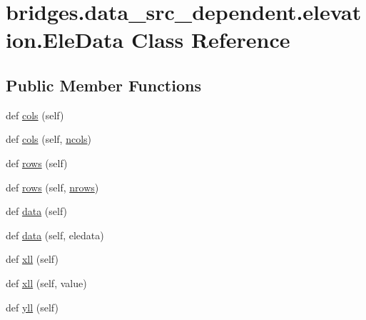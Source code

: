 \hypertarget{classbridges_1_1data__src__dependent_1_1elevation_1_1_ele_data}{}\section{bridges.\+data\+\_\+src\+\_\+dependent.\+elevation.\+Ele\+Data Class Reference}
\label{classbridges_1_1data__src__dependent_1_1elevation_1_1_ele_data}
\subsection*{Public Member Functions}
\begin{DoxyCompactItemize}
\item 
def \mbox{\hyperlink{classbridges_1_1data__src__dependent_1_1elevation_1_1_ele_data_af9c8f34640f7c642e7f677b2e2249b9f}{cols}} (self)
\item 
def \mbox{\hyperlink{classbridges_1_1data__src__dependent_1_1elevation_1_1_ele_data_a0b97efb0e65234ae5f99ba3996ea96b8}{cols}} (self, \mbox{\hyperlink{classbridges_1_1data__src__dependent_1_1elevation_1_1_ele_data_a01622cab9ec625d57120f195c82e2c4e}{ncols}})
\item 
def \mbox{\hyperlink{classbridges_1_1data__src__dependent_1_1elevation_1_1_ele_data_ad31fe5180f8724693680c705850d6de7}{rows}} (self)
\item 
def \mbox{\hyperlink{classbridges_1_1data__src__dependent_1_1elevation_1_1_ele_data_aea0cde9fa7dcb3de0ad526b39ea4a95d}{rows}} (self, \mbox{\hyperlink{classbridges_1_1data__src__dependent_1_1elevation_1_1_ele_data_a9451760998220fcc4e214842fa5a5f65}{nrows}})
\item 
def \mbox{\hyperlink{classbridges_1_1data__src__dependent_1_1elevation_1_1_ele_data_afaa0a5516f1c573ad5363bbad52baa7c}{data}} (self)
\item 
def \mbox{\hyperlink{classbridges_1_1data__src__dependent_1_1elevation_1_1_ele_data_a54c5d5cb0aefc6f83366f342f3572cc8}{data}} (self, eledata)
\item 
def \mbox{\hyperlink{classbridges_1_1data__src__dependent_1_1elevation_1_1_ele_data_a19414830f100729c1b659acd3cc00905}{xll}} (self)
\item 
def \mbox{\hyperlink{classbridges_1_1data__src__dependent_1_1elevation_1_1_ele_data_a1fb07f071f9c21eb6b4169b47ebbeff2}{xll}} (self, value)
\item 
def \mbox{\hyperlink{classbridges_1_1data__src__dependent_1_1elevation_1_1_ele_data_ab6614ee1ad466541a0e94e33d9fadcdd}{yll}} (self)

\end{DoxyCompactItemize}
